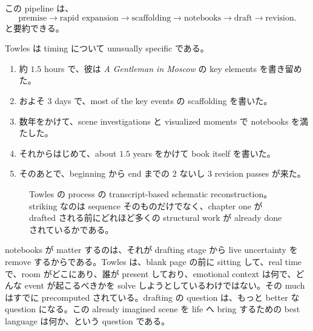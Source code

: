 この pipeline は、
\begin{equation}
\text{premise} \longrightarrow \text{rapid expansion} \longrightarrow \text{scaffolding} \longrightarrow \text{notebooks} \longrightarrow \text{draft} \longrightarrow \text{revision}.
\end{equation}
と要約できる。

Towles は timing について unusually specific である。
\begin{enumerate}
\item 約 \(1.5\) hours で、彼は \emph{A Gentleman in Moscow} の key elements を書き留めた。
\item およそ \(3\) days で、most of the key events の scaffolding を書いた。
\item 数年をかけて、scene investigations と visualized moments で notebooks を満たした。
\item それからはじめて、about \(1.5\) years をかけて book itself を書いた。
\item そのあとで、beginning から end までの \(2\) ないし \(3\) revision passes が来た。
\end{enumerate}

\begin{figure}[h]
\centering
{}
\caption{Towles の process の transcript-based schematic reconstruction。striking なのは sequence そのものだけでなく、chapter one が drafted される前にどれほど多くの structural work が already done されているかである。}
\end{figure}

notebooks が matter するのは、それが drafting stage から live uncertainty を remove するからである。Towles は、blank page の前に sitting して、real time で、room がどこにあり、誰が present しており、emotional context は何で、どんな event が起こるべきかを solve しようとしているわけではない。その much はすでに precomputed されている。drafting の question は、もっと better な question になる。この already imagined scene を life へ bring するための best language は何か、という question である。

